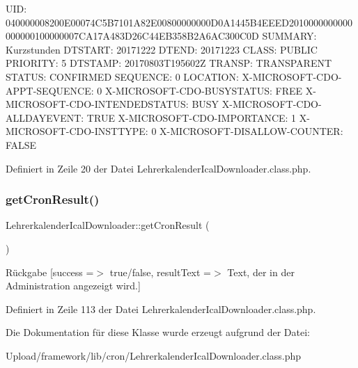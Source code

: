 U\+ID\+: 040000008200\+E00074\+C5\+B7101\+A82\+E00800000000\+D0\+A1445\+B4\+E\+E\+E\+D2010000000000000000100000007\+C\+A17\+A483\+D26\+C44\+E\+B358\+B2\+A6\+A\+C300\+C0D S\+U\+M\+M\+A\+RY\+: Kurzstunden D\+T\+S\+T\+A\+RT\+: 20171222 D\+T\+E\+ND\+: 20171223 C\+L\+A\+SS\+: P\+U\+B\+L\+IC P\+R\+I\+O\+R\+I\+TY\+: 5 D\+T\+S\+T\+A\+MP\+: 20170803\+T195602Z T\+R\+A\+N\+SP\+: T\+R\+A\+N\+S\+P\+A\+R\+E\+NT S\+T\+A\+T\+US\+: C\+O\+N\+F\+I\+R\+M\+ED S\+E\+Q\+U\+E\+N\+CE\+: 0 L\+O\+C\+A\+T\+I\+ON\+: X-\/\+M\+I\+C\+R\+O\+S\+O\+F\+T-\/\+C\+D\+O-\/\+A\+P\+P\+T-\/\+S\+E\+Q\+U\+E\+N\+CE\+: 0 X-\/\+M\+I\+C\+R\+O\+S\+O\+F\+T-\/\+C\+D\+O-\/\+B\+U\+S\+Y\+S\+T\+A\+T\+US\+: F\+R\+EE X-\/\+M\+I\+C\+R\+O\+S\+O\+F\+T-\/\+C\+D\+O-\/\+I\+N\+T\+E\+N\+D\+E\+D\+S\+T\+A\+T\+US\+: B\+U\+SY X-\/\+M\+I\+C\+R\+O\+S\+O\+F\+T-\/\+C\+D\+O-\/\+A\+L\+L\+D\+A\+Y\+E\+V\+E\+NT\+: T\+R\+UE X-\/\+M\+I\+C\+R\+O\+S\+O\+F\+T-\/\+C\+D\+O-\/\+I\+M\+P\+O\+R\+T\+A\+N\+CE\+: 1 X-\/\+M\+I\+C\+R\+O\+S\+O\+F\+T-\/\+C\+D\+O-\/\+I\+N\+S\+T\+T\+Y\+PE\+: 0 X-\/\+M\+I\+C\+R\+O\+S\+O\+F\+T-\/\+D\+I\+S\+A\+L\+L\+O\+W-\/\+C\+O\+U\+N\+T\+ER\+: F\+A\+L\+SE

Definiert in Zeile 20 der Datei Lehrerkalender\+Ical\+Downloader.\+class.\+php.

\mbox{\label{class_lehrerkalender_ical_downloader_a49cb738163fe83288c1f80cfa80031e6}} 
\subsubsection{\texorpdfstring{get\+Cron\+Result()}{getCronResult()}}
{\footnotesize\ttfamily Lehrerkalender\+Ical\+Downloader\+::get\+Cron\+Result (\begin{DoxyParamCaption}{ }\end{DoxyParamCaption})}

\begin{DoxyReturn}{Rückgabe}
\mbox{[}\textquotesingle{}success\textquotesingle{} =$>$ \textquotesingle{}true/false\textquotesingle{}, \textquotesingle{}result\+Text\textquotesingle{} =$>$ \textquotesingle{}Text, der in der Administration angezeigt wird.\textquotesingle{}\mbox{]} 
\end{DoxyReturn}


Definiert in Zeile 113 der Datei Lehrerkalender\+Ical\+Downloader.\+class.\+php.



Die Dokumentation für diese Klasse wurde erzeugt aufgrund der Datei\+:\begin{DoxyCompactItemize}
\item 
Upload/framework/lib/cron/Lehrerkalender\+Ical\+Downloader.\+class.\+php\end{DoxyCompactItemize}
